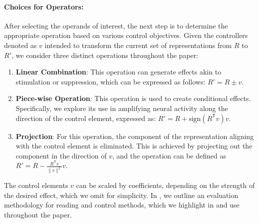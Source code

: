 \paragraph{Choices for Operators:}
After selecting the operands of interest, the next step is to determine the appropriate operation based on various control objectives. Given the controllers denoted as $v$ intended to transform the current set of representations from $R$ to $R'$, we consider three distinct operations throughout the paper:
\begin{enumerate}[leftmargin=*]
    \item \textbf{Linear Combination}: This operation can generate effects akin to stimulation or suppression, which can be expressed as follows: $R' = R \pm v$.
    \item \textbf{Piece-wise Operation}: This operation is used to create conditional effects. Specifically, we explore its use in amplifying neural activity along the direction of the control element, expressed as: $R' = R + \text{sign}(R^\mathsf{T} v) v$.
    \item \textbf{Projection}: For this operation, the component of the representation aligning with the control element is eliminated. This is achieved by projecting out the component in the direction of $v$, and the operation can be defined as $R' = R - \frac{R^\mathsf{T} v }{\| v \|^2} v$.
\end{enumerate}
The control elements $v$ can be scaled by coefficients, depending on the strength of the desired effect, which we omit for simplicity. In , we outline an evaluation methodology for reading and control methods, which we highlight in  and use throughout the paper.
